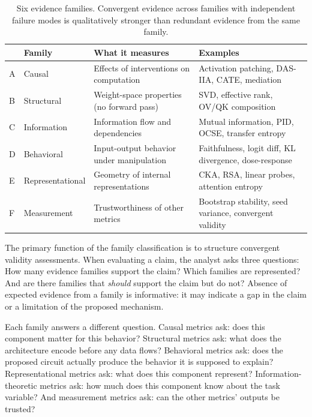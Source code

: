 \documentclass[10pt]{article}
\begin{document}
\begin{table}[H]
\centering
\small
\caption{Six evidence families. Convergent evidence across families with independent failure modes is qualitatively stronger than redundant evidence from the same family.}
\label{tab:families}
\renewcommand{\arraystretch}{1.2}
\begin{tabular}{@{}ll>{\raggedright\arraybackslash}p{4.5cm}>{\raggedright\arraybackslash}p{5cm}@{}}
\toprule
& \textbf{Family} & \textbf{What it measures} & \textbf{Examples} \\
\midrule
A & Causal & Effects of interventions on computation & Activation patching, DAS-IIA, CATE, mediation \\
\midrule
B & Structural & Weight-space properties (no forward pass) & SVD, effective rank, OV/QK composition \\
\midrule
C & Information & Information flow and dependencies & Mutual information, PID, OCSE, transfer entropy \\
\midrule
D & Behavioral & Input-output behavior under manipulation & Faithfulness, logit diff, KL divergence, dose-response \\
\midrule
E & Representational & Geometry of internal representations & CKA, RSA, linear probes, attention entropy \\
\midrule
F & Measurement & Trustworthiness of other metrics & Bootstrap stability, seed variance, convergent validity \\
\bottomrule
\end{tabular}
\end{table}

The primary function of the family classification is to structure convergent validity assessments. When evaluating a claim, the analyst asks three questions: How many evidence families support the claim? Which families are represented? And are there families that \emph{should} support the claim but do not? Absence of expected evidence from a family is informative: it may indicate a gap in the claim or a limitation of the proposed mechanism.

Each family answers a different question. Causal metrics ask: does this component matter for this behavior? Structural metrics ask: what does the architecture encode before any data flows? Behavioral metrics ask: does the proposed circuit actually produce the behavior it is supposed to explain? Representational metrics ask: what does this component represent? Information-theoretic metrics ask: how much does this component know about the task variable? And measurement metrics ask: can the other metrics' outputs be trusted?
\end{document}
